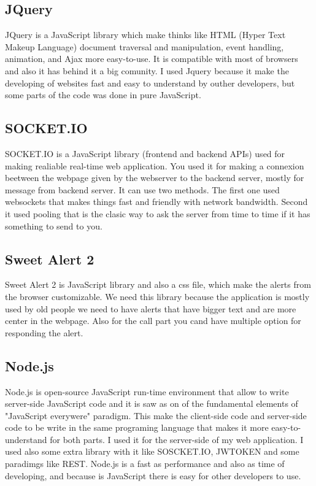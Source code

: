 \subsection{JQuery}
\label{sub-sec:javascript-jquery}
JQuery is a JavaScript library which make thinks like HTML (Hyper Text Makeup Language)
document traversal and manipulation, event handling, animation, and Ajax more easy-to-use.
It is compatible with most of browsers and also it has behind it a big comunity. I used
Jquery because it make the developing of websites fast and easy to understand by outher
developers, but some parts of the code was done in pure JavaScript.


\subsection{SOCKET.IO}
\label{sub-sec:javascript-socket}
SOCKET.IO is a JavaScript library (frontend and backend APIs) used for making
realiable real-time web application. You used it for making a connexion beetween
the webpage given by the webserver to the backend server, mostly for message from
backend server. It can use two methods. The first one used websockets that makes
things fast and friendly with network bandwidth. Second it used pooling that is the
clasic way to ask the server from time to time if it has something to send to you.
\subsection{Sweet Alert 2}
\label{sub-sec:javascript-swalert}
Sweet Alert 2 is JavaScript library and also a css file, which make the alerts from
the browser customizable. We need this library because the application is mostly
used by old people we need to have alerts that have bigger text and are more center
in the webpage. Also for the call part you cand have multiple option for responding
the alert.


\subsection{Node.js}
\label{sub-sec:javascript-node}
Node.js is open-source JavaScript run-time environment that allow to write server-side
JavaScript code and it is saw as on of the fundamental elements of "JavaScript everywere"
paradigm. This make the client-side code and server-side code to be write in the same
programing language that makes it more easy-to-understand for both parts. I used it
for the server-side of my web application. I used also some extra library with it like
SOSCKET.IO, JWTOKEN and some paradimgs like REST. Node.js is a fast as performance and
also as time of developing, and because is JavaScript there is easy for other developers
to use.


